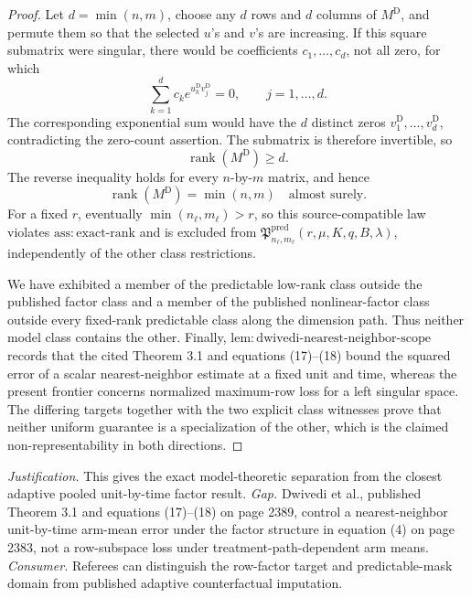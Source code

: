 \documentclass{article}
\begin{document}
\begin{proof}
Let \(d=\min(n,m)\), choose any \(d\) rows and \(d\) columns of \(M^{\mathrm D}\), and permute them so that the selected \(u\)'s and \(v\)'s are increasing.  If this square submatrix were singular, there would be coefficients \(c_1,\ldots,c_d\), not all zero, for which
\[
 \sum_{k=1}^d c_k e^{u_k^{\mathrm D}v_j^{\mathrm D}}=0,
 \qquad j=1,\ldots,d.
\]
The corresponding exponential sum would have the \(d\) distinct zeros \(v_1^{\mathrm D},\ldots,v_d^{\mathrm D}\), contradicting the zero-count assertion.  The submatrix is therefore invertible, so
\[
 \operatorname{rank}(M^{\mathrm D})\ge d.
\]
The reverse inequality holds for every \(n\)-by-\(m\) matrix, and hence
\[
 \operatorname{rank}(M^{\mathrm D})=\min(n,m)
 \quad\text{almost surely}.
\]
For a fixed \(r\), eventually \(\min(n_\ell,m_\ell)>r\), so this source-compatible law violates \(\mathrm{ass:exact\mbox{-}rank}\) and is excluded from \(\mathfrak P^{\mathrm{pred}}_{n_\ell,m_\ell}(r,\mu,K,q,B,\lambda)\), independently of the other class restrictions.

We have exhibited a member of the predictable low-rank class outside the published factor class and a member of the published nonlinear-factor class outside every fixed-rank predictable class along the dimension path.  Thus neither model class contains the other.  Finally, \(\mathrm{lem:dwivedi\mbox{-}nearest\mbox{-}neighbor\mbox{-}scope}\) records that the cited Theorem 3.1 and equations (17)--(18) bound the squared error of a scalar nearest-neighbor estimate at a fixed unit and time, whereas the present frontier concerns normalized maximum-row loss for a left singular space.  The differing targets together with the two explicit class witnesses prove that neither uniform guarantee is a specialization of the other, which is the claimed non-representability in both directions.
\end{proof}
\par\smallskip\noindent \textit{Justification.} This gives the exact model-theoretic separation from the closest adaptive pooled unit-by-time factor result. \textit{Gap.} Dwivedi et al., published Theorem 3.1 and equations (17)--(18) on page 2389, control a nearest-neighbor unit-by-time arm-mean error under the factor structure in equation (4) on page 2383, not a row-subspace loss under treatment-path-dependent arm means. \textit{Consumer.} Referees can distinguish the row-factor target and predictable-mask domain from published adaptive counterfactual imputation.
\end{document}
